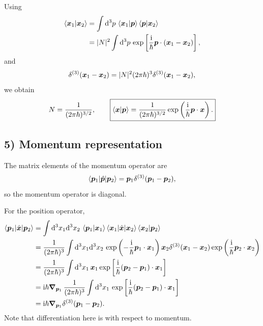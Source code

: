 Using
\begin{equation}\begin{aligned}
\left\langle\bm{x}_1\middle|\bm{x}_2\right\rangle
&=\int\mathrm{d}^3p\,\left\langle\bm{x}_1\middle|\bm{p}\right\rangle\left\langle\bm{p}\middle|\bm{x}_2\right\rangle\\
&=|N|^2\int\mathrm{d}^3p\,\exp\left[\frac{\mathrm{i}}\hbar\bm{p}\cdot(\bm{x}_1-\bm{x}_2)\right],
\end{aligned}\end{equation}
and
\begin{equation}
\delta^{(3)}(\bm{x}_1-\bm{x}_2)
=|N|^2(2\pi\hbar)^3\delta^{(3)}(\bm{x}_1-\bm{x}_2),
\end{equation}
we obtain
\begin{equation}
N=\frac1{(2\pi\hbar)^{3/2}},\qquad
\boxed{\left\langle\bm{x}\middle|\bm{p}\right\rangle
=\frac1{(2\pi\hbar)^{3/2}}\exp\left(\frac{\mathrm{i}}\hbar\bm{p}\cdot\bm{x}\right).}
\end{equation}
\subsection*{5) Momentum representation}
The matrix elements of the momentum operator are
\begin{equation}
\left\langle\bm{p}_1\middle|\hat{\bm{p}}\middle|\bm{p}_2\right\rangle
=\bm{p}_1\delta^{(3)}(\bm{p}_1-\bm{p}_2),
\end{equation}
so the momentum operator is diagonal.

For the position operator,
\begin{equation}\begin{aligned}
\left\langle\bm{p}_1\middle|\hat{\bm{x}}\middle|\bm{p}_2\right\rangle
&=\int\mathrm{d}^3x_1\mathrm{d}^3x_2\,
\left\langle\bm{p}_1\middle|\bm{x}_1\right\rangle
\left\langle\bm{x}_1\middle|\hat{\bm{x}}\middle|\bm{x}_2\right\rangle
\left\langle\bm{x}_2\middle|\bm{p}_2\right\rangle\\
&=\frac1{(2\pi\hbar)^3}\int\mathrm{d}^3x_1\mathrm{d}^3x_2\,
\exp\left(-\frac{\mathrm{i}}\hbar\bm{p}_1\cdot\bm{x}_1\right)
\bm{x}_2\delta^{(3)}(\bm{x}_1-\bm{x}_2)
\exp\left(\frac{\mathrm{i}}\hbar\bm{p}_2\cdot\bm{x}_2\right)\\
&=\frac1{(2\pi\hbar)^3}\int\mathrm{d}^3x_1\,
\bm{x}_1\exp\left[\frac{\mathrm{i}}\hbar(\bm{p}_2-\bm{p}_1)\cdot\bm{x}_1\right]\\
&=\mathrm{i}\hbar\bm{\nabla}_{\bm{p}_1}\,
\frac1{(2\pi\hbar)^3}\int\mathrm{d}^3x_1\,
\exp\left[\frac{\mathrm{i}}\hbar(\bm{p}_2-\bm{p}_1)\cdot\bm{x}_1\right]\\
&=\mathrm{i}\hbar\bm{\nabla}_{\bm{p}_1}\delta^{(3)}(\bm{p}_1-\bm{p}_2).
\end{aligned}\end{equation}
Note that differentiation here is with respect to momentum.

